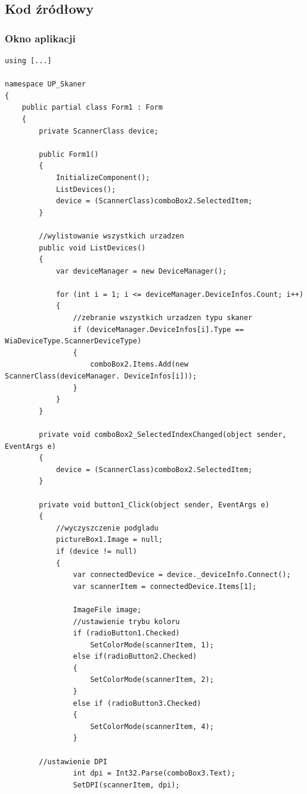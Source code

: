 \documentclass[12pt,a4paper,notitlepage]{report}
\begin{document}
\begin{adjustwidth}{0pt}{-50pt}
\subsection{Kod źródłowy}
\subsubsection{Okno aplikacji}
\begin{lstlisting}
using [...]

namespace UP_Skaner
{
    public partial class Form1 : Form
    {
        private ScannerClass device;

        public Form1()
        {
            InitializeComponent();
            ListDevices();
            device = (ScannerClass)comboBox2.SelectedItem;
        }

		//wylistowanie wszystkich urzadzen
        public void ListDevices()
        {
            var deviceManager = new DeviceManager();

            for (int i = 1; i <= deviceManager.DeviceInfos.Count; i++)
            {
            	//zebranie wszystkich urzadzen typu skaner
                if (deviceManager.DeviceInfos[i].Type == WiaDeviceType.ScannerDeviceType)
                {
                    comboBox2.Items.Add(new ScannerClass(deviceManager. DeviceInfos[i]));
                }
            }
        }

        private void comboBox2_SelectedIndexChanged(object sender, EventArgs e)
        {
            device = (ScannerClass)comboBox2.SelectedItem;
        }
        
        private void button1_Click(object sender, EventArgs e)
        {
            //wyczyszczenie podgladu
            pictureBox1.Image = null;
            if (device != null)
            {
                var connectedDevice = device._deviceInfo.Connect();
                var scannerItem = connectedDevice.Items[1];

                ImageFile image;
                //ustawienie trybu koloru
                if (radioButton1.Checked)
                    SetColorMode(scannerItem, 1);
                else if(radioButton2.Checked)
                {
                    SetColorMode(scannerItem, 2);
                }
                else if (radioButton3.Checked)
                {
                    SetColorMode(scannerItem, 4);
                }

		//ustawienie DPI
                int dpi = Int32.Parse(comboBox3.Text);
                SetDPI(scannerItem, dpi);
                

\end{lstlisting}
\end{adjustwidth}
\end{document}
